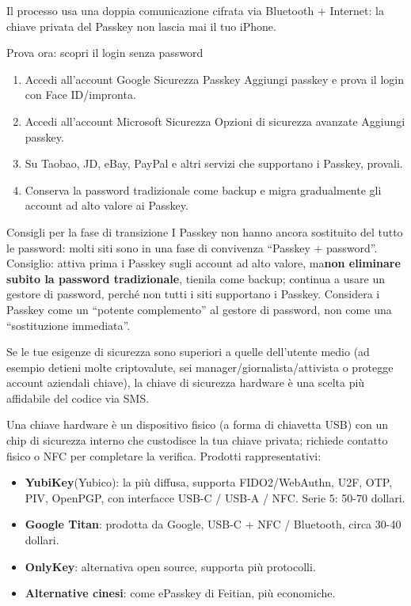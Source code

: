 Il processo usa una doppia comunicazione cifrata via Bluetooth + Internet: la chiave privata del Passkey non lascia mai il tuo iPhone.

\begin{tcbpractice}{Prova ora: scopri il login senza password}
\begin{enumerate}
  \item Accedi all'account Google Sicurezza Passkey Aggiungi passkey e prova il login con Face ID/impronta.
  \item Accedi all'account Microsoft Sicurezza Opzioni di sicurezza avanzate Aggiungi passkey.
  \item Su Taobao, JD, eBay, PayPal e altri servizi che supportano i Passkey, provali.
  \item Conserva la password tradizionale come backup e migra gradualmente gli account ad alto valore ai Passkey.
\end{enumerate}

\end{tcbpractice}

\begin{tcbwarn}{Consigli per la fase di transizione}
I Passkey non hanno ancora sostituito del tutto le password: molti siti sono in una fase di convivenza “Passkey + password”. Consiglio: attiva prima i Passkey sugli account ad alto valore, ma\textbf{non eliminare subito la password tradizionale}, tienila come backup; continua a usare un gestore di password, perché non tutti i siti supportano i Passkey. Considera i Passkey come un “potente complemento” al gestore di password, non come una “sostituzione immediata”.

\end{tcbwarn}


Se le tue esigenze di sicurezza sono superiori a quelle dell'utente medio (ad esempio detieni molte criptovalute, sei manager/giornalista/attivista o protegge account aziendali chiave), la chiave di sicurezza hardware è una scelta più affidabile del codice via SMS.


Una chiave hardware è un dispositivo fisico (a forma di chiavetta USB) con un chip di sicurezza interno che custodisce la tua chiave privata; richiede contatto fisico o NFC per completare la verifica. Prodotti rappresentativi:

\begin{itemize}
  \item \textbf{YubiKey}(Yubico): la più diffusa, supporta FIDO2/WebAuthn, U2F, OTP, PIV, OpenPGP, con interfacce USB-C / USB-A / NFC. Serie 5: 50-70 dollari.
  \item \textbf{Google Titan}: prodotta da Google, USB-C + NFC / Bluetooth, circa 30-40 dollari.
  \item \textbf{OnlyKey}: alternativa open source, supporta più protocolli.
  \item \textbf{Alternative cinesi}: come ePasskey di Feitian, più economiche.
\end{itemize}

